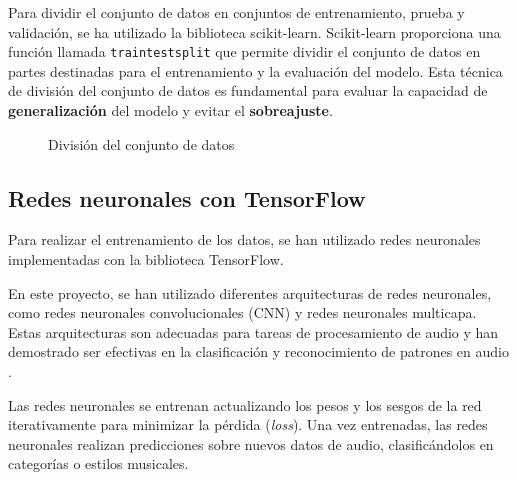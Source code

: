 Para dividir el conjunto de datos en conjuntos de entrenamiento, prueba y validación, se ha utilizado la biblioteca scikit-learn. 
Scikit-learn proporciona una función llamada \texttt{train\textunderscore test\textunderscore split} \cite{scikit_tts} que permite dividir el conjunto de datos en partes destinadas para el entrenamiento y la evaluación del modelo.
Esta técnica de división del conjunto de datos es fundamental para evaluar la capacidad de \textbf{generalización} del modelo y evitar el \textbf{sobreajuste}.

\begin{figure}
  \centering
  \caption{División del conjunto de datos}
\end{figure}

\subsection{Redes neuronales con TensorFlow}

Para realizar el entrenamiento de los datos, se han utilizado redes neuronales implementadas con la biblioteca TensorFlow.

En este proyecto, se han utilizado diferentes arquitecturas de redes neuronales, como redes neuronales convolucionales (CNN) y redes neuronales multicapa.
Estas arquitecturas son adecuadas para tareas de procesamiento de audio y han demostrado ser efectivas en la clasificación y reconocimiento de patrones en audio \cite{article_cnn}. 

Las redes neuronales se entrenan actualizando los pesos y los sesgos de la red iterativamente para minimizar la pérdida (\textit{loss}). Una vez entrenadas, las redes neuronales realizan predicciones sobre nuevos datos de audio, clasificándolos en categorías o estilos musicales.